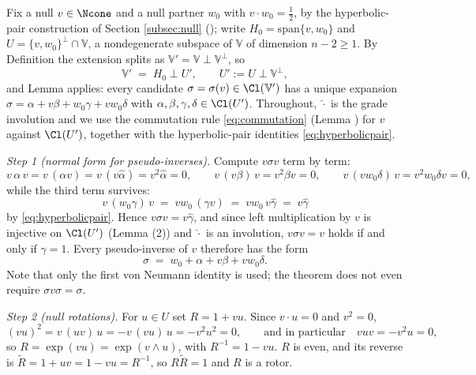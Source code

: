 Fix a null $v \in \Ncone$ and a null partner $w_0$ with $v \cdot w_0 = \tfrac12$, by the hyperbolic-pair construction of Section \ref{subsec:null} (); write $H_0 = \mathrm{span}\{v, w_0\}$ and $U = \{v, w_0\}^{\perp} \cap \mathbb{V}$, a nondegenerate subspace of $\mathbb{V}$ of dimension $n - 2 \geq 1$. By Definition  the extension splits as $\mathbb{V}' = \mathbb{V} \perp \mathbb{V}^{\perp}$, so
\[
\mathbb{V}' \;=\; H_0 \perp U', \qquad U' \mathrel{:=} U \perp \mathbb{V}^{\perp},
\]
and Lemma  applies: every candidate $\sigma = \sigma(v) \in \Cl(\mathbb{V}')$ has a unique expansion $\sigma = \alpha + v\beta + w_0\gamma + v w_0 \delta$ with $\alpha, \beta, \gamma, \delta \in \Cl(U')$. Throughout, $\hat{\cdot}$ is the grade involution and we use the commutation rule \eqref{eq:commutation} (Lemma ) for $v$ against $\Cl(U')$, together with the hyperbolic-pair identities \eqref{eq:hyperbolicpair}.

\emph{Step 1 (normal form for pseudo-inverses).} Compute $v\sigma v$ term by term:
\[
v\,\alpha\, v = v\, (\alpha v) = v\,(v \hat{\alpha}) = v^2 \hat\alpha = 0, \qquad
v\,(v\beta)\,v = v^2 \beta v = 0, \qquad
v\,(v w_0 \delta)\,v = v^2 w_0 \delta v = 0,
\]
while the third term survives:
\[
v\,(w_0 \gamma)\,v \;=\; v w_0\,(\gamma v) \;=\; v w_0\, v \hat{\gamma} \;=\; v \hat{\gamma}
\]
by \eqref{eq:hyperbolicpair}. Hence $v \sigma v = v \hat{\gamma}$, and since left multiplication by $v$ is injective on $\Cl(U')$ (Lemma (2)) and $\hat{\cdot}$ is an involution, $v \sigma v = v$ holds if and only if $\gamma = 1$. Every pseudo-inverse of $v$ therefore has the form
\[
\sigma \;=\; w_0 + \alpha + v\beta + v w_0 \delta .
\]
Note that only the first von Neumann identity is used; the theorem does not even require $\sigma v \sigma = \sigma$.

\emph{Step 2 (null rotations).} For $u \in U$ set $R = 1 + vu$. Since $v \cdot u = 0$ and $v^2 = 0$,
\[
(vu)^2 = v\,(uv)\,u = -v\,(vu)\,u = -v^2 u^2 = 0, \qquad \text{and in particular} \quad vuv = -v^2u = 0,
\]
so $R = \exp(vu) = \exp(v \wedge u)$, with $R^{-1} = 1 - vu$. $R$ is even, and its reverse is $\widetilde{R} = 1 + uv = 1 - vu = R^{-1}$, so $R \widetilde{R} = 1$ and $R$ is a rotor.

